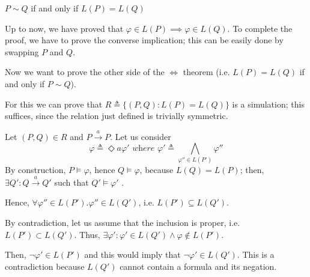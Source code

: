 \begin{Thm}{$P\sim Q$ if and only if $L(P)=L(Q)$}{}
\begin{demonstration}
Up to now, we have proved that $\varphi\in L(P)\implies \varphi\in L(Q)$. To complete the proof, we have to prove the converse implication; this can be easily done by swapping $P$ and $Q$.
\end{demonstration}

Now we want to prove the other side of the $\iff$ theorem (i.e. $L(P)=L(Q)$  if and only if  $P\sim Q$). 
\begin{demonstration}
For this we can prove that $R\triangleq\{(P,Q):L(P)=L(Q)\}$ is a simulation; this suffices, since the relation just defined is trivially symmetric. 

Let $(P, Q)\in R$ and $P\xrightarrow{a} P$. Let us consider
\begin{equation*}
    \varphi\triangleq\Diamond a\varphi' \textit{ where }\varphi'\triangleq\bigwedge_{\varphi''\in L(P')}\varphi''
\end{equation*}
By construction, $P \models \varphi$, hence $Q \models \varphi$, because $L(Q) = L(P )$; then, $\exists Q' : Q \xrightarrow{a} Q'$ such that $Q'\models \varphi'$ . 

Hence, $\forall\varphi''\in L(P').\varphi'' \in L(Q')$, i.e. $L(P')\subseteq L(Q')$. 

By contradiction, let us assume that the inclusion is proper, i.e. $L(P')\subset L(Q')$. Thus, $\exists\varphi' : \varphi'\in L(Q')\land \varphi \notin L(P')$. 

Then, $\lnot\varphi'\in L(P')$ and this would imply that $\lnot\varphi'\in L(Q')$. This is a contradiction because $L(Q')$ cannot contain a formula and its negation.
\end{demonstration}
\end{Thm}

